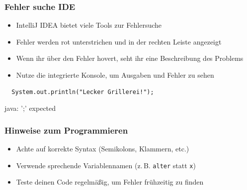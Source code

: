 \documentclass{../../presentation}
\begin{document}
\begin{frame}[fragile]
  \frametitle{Fehler suche IDE}
  \begin{itemize}
    \item IntelliJ IDEA bietet viele Tools zur Fehlersuche
    \item Fehler werden rot unterstrichen und in der rechten Leiste angezeigt
    \item Wenn ihr über den Fehler hovert, seht ihr eine Beschreibung des Problems
    \item Nutze die integrierte Konsole, um Ausgaben und Fehler zu sehen \newline
  \end{itemize}
  \begin{verbatim}
  System.out.println("Lecker Grillerei!");
  \end{verbatim}
  \begin{ausgabe}
    java: ';' expected
  \end{ausgabe}
\end{frame}

\begin{frame}[fragile]
  \frametitle{Hinweise zum Programmieren}
  \begin{itemize}
    \item Achte auf korrekte Syntax (Semikolons, Klammern, etc.)
    \item Verwende sprechende Variablennamen (z.\,B. \texttt{alter} statt \texttt{x})
    \item Teste deinen Code regelmäßig, um Fehler frühzeitig zu finden
  \end{itemize}
\end{frame}

\begin{frame}
\end{frame}
\end{document}
